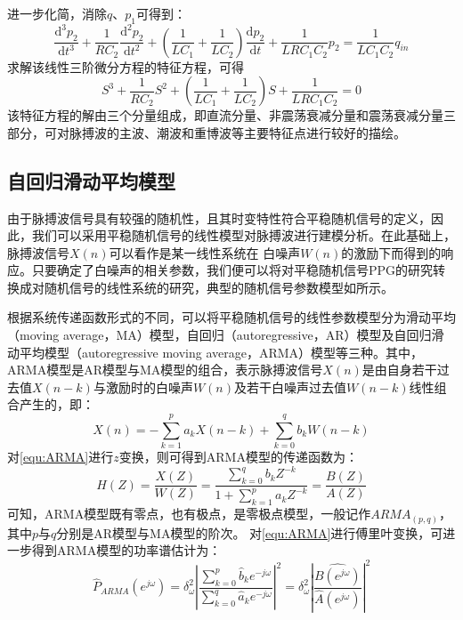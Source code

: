 进一步化简，消除$q$、$p_{1}$可得到：
\begin{equation}
    \label{euq:diff}
    \frac{\mathrm{d^3} p_{2}}{\mathrm{d} t^3}+\frac{1}{RC_{2}}\frac{\mathrm{d}^2p_{2} }{\mathrm{d} t^2}+
    (\frac{1}{LC_{1}}+\frac{1}{LC_{2}})\frac{\mathrm{d} p_{2}}{\mathrm{d} t}+\frac{1}{LRC_{1}C_{2}}p_{2}
    =\frac{1}{LC_{1}C_{2}}q_{in}
\end{equation}
求解该线性三阶微分方程的特征方程，可得
\begin{equation}
    \label{euq:character}
    S^3+\frac{1}{RC_{2}}S^2+(\frac{1}{LC_{1}}+\frac{1}{LC_{2}})S+\frac{1}{LRC_{1}C_{2}}=0
\end{equation}
该特征方程的解由三个分量组成，即直流分量、非震荡衰减分量和震荡衰减分量三部分，可对脉搏波的主波、潮波和重博波等主要特征点进行较好的描绘。

\subsection{自回归滑动平均模型}
由于脉搏波信号具有较强的随机性，且其时变特性符合平稳随机信号的定义，因此，我们可以采用平稳随机信号的线性模型对脉搏波进行建模分析\cite{TJXHCL,PPGYY}。在此基础上，脉搏波信号$X(n)$可以看作是某一线性系统在
白噪声$W(n)$的激励下而得到的响应。只要确定了白噪声的相关参数，我们便可以将对平稳随机信号PPG的研究转换成对随机信号的线性系统的研究，典型的随机信号参数模型如所示。

根据系统传递函数形式的不同，可以将平稳随机信号的线性参数模型分为滑动平均（moving average，MA）模型，自回归（autoregressive，AR）模型及自回归滑动平均模型（autoregressive moving average，ARMA）模型等三种。其中，
ARMA模型是AR模型与MA模型的组合，表示脉搏波信号$X(n)$是由自身若干过去值$X(n-k)$与激励时的白噪声$W(n)$及若干白噪声过去值$W(n-k)$线性组合产生的，即：
\begin{equation}
    \label{equ:ARMA}
    X(n)=-\sum_{k=1}^{p}a_{k}X(n-k)+\sum_{k=0}^{q}b_{k}W(n-k)
\end{equation}
对\autoref{equ:ARMA}进行$z$变换，则可得到ARMA模型的传递函数为：
\begin{equation}
    \label{equ:ARMAH}
    H(Z)=\frac{X(Z)}{W(Z)}=\frac{\sum_{k=0}^{q}b_{k}Z^{-k}}{1+\sum_{k=1}^{p}a_{k}Z^{-k}}=\frac{B(Z)}{A(Z)}
\end{equation}
可知，ARMA模型既有零点，也有极点，是零极点模型，一般记作$ARMA_{(p,q)}$，其中$p$与$q$分别是AR模型与MA模型的阶次。
对\autoref{equ:ARMA}进行傅里叶变换，可进一步得到ARMA模型的功率谱估计为\cite{TJXHCL}：
\begin{equation}
    \label{equ:ARMAP}
    \hat{P}_{ARMA}(e^{j\omega} )=
    \delta _{\omega}^2\left |  \frac{\sum_{k=0}^{p}\hat{b}_{k}e^{-j\omega}}{\sum_{k=0}^{q}\hat{a}_{k}e^{-j\omega}}\right |^2
    =\delta _{\omega}^2\left |  \frac{\hat{B(e^{j\omega} )}}{\hat{A}(e^{j\omega} )}\right |^2
\end{equation}

